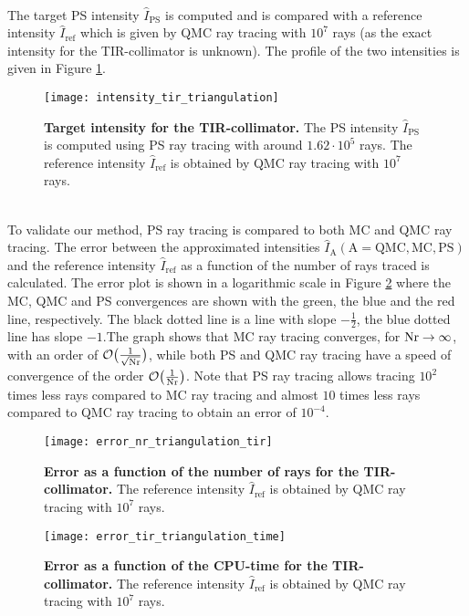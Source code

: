  \\ \indent 
The target PS intensity $\hat{I}_{\textrm{PS}}$ is computed and is compared with a reference intensity $\hat{I}_{\textrm{ref}}$ which is given by QMC ray tracing with $10^7$ rays (as the exact intensity for the TIR-collimator is unknown). The profile of the two intensities is given in Figure \ref{fig:intensity_tir_triangulation}.
 \begin{figure}[ht]
  \center
  \texttt{[image: intensity\_tir\_triangulation]}
  \caption{\textbf{Target intensity for the TIR-collimator.} The PS intensity $\hat{I}_{\textrm{PS}}$ is computed using PS ray tracing with around $1.62\cdot 10^5$ rays. The reference intensity $\hat{I}_{\textrm{ref}}$ is obtained by QMC ray tracing with $10^7$ rays.}
  \label{fig:intensity_tir_triangulation}
\end{figure}
\\ \indent
To validate our method, PS ray tracing is compared to both MC and QMC ray tracing. The error between the approximated intensities $\hat{I}_{\textrm{A}} (\textrm{A}=\textrm{QMC}, \textrm{MC}, \textrm{PS})$ and the reference intensity $\hat{I}_{\textrm{ref}}$ as a function of the number of rays traced is calculated. The error plot is shown in a logarithmic scale in Figure \ref{fig:error_tir_triangulation} where the MC, QMC and PS convergences are shown with the green, the blue and the red line, respectively. The black dotted line is a line with slope $-\frac{1}{2}$, the blue dotted line has slope $-1$.The graph shows that MC ray tracing converges, for $\textrm{Nr} \rightarrow \infty$, with an order of $\mathcal{O}\big(\frac{1}{\sqrt{\textrm{Nr}}}\big)$, while both PS and QMC ray tracing have a speed of convergence of the order $\mathcal{O}\big(\frac{1}{\textrm{Nr}}\big)$. 
Note that PS ray tracing allows tracing $10^2$ times less rays compared to MC ray tracing and almost $10$ times less rays compared to QMC ray tracing to obtain an error of $10^{-4}$.
 \begin{figure}[t]
  \center
  \texttt{[image: error\_nr\_triangulation\_tir]}
  \caption{\textbf{Error as a function of the number of rays for the TIR-collimator.} The reference intensity $\hat{I}_{\textrm{ref}}$ is obtained by QMC ray tracing with $10^7$ rays.}
  \label{fig:error_tir_triangulation}
\end{figure}
\begin{figure}[t]
  \center
  \texttt{[image: error\_tir\_triangulation\_time]}
  \caption{\textbf{Error as a function of the CPU-time for the TIR-collimator.} The reference intensity $\hat{I}_{\textrm{ref}}$ is obtained by QMC ray tracing with $10^7$ rays.}
  \label{fig:error_tir_triangulation_time}
\end{figure}
